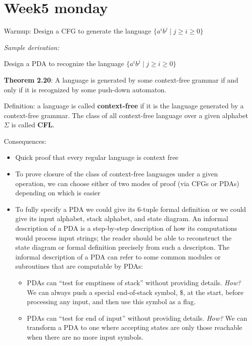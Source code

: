 \documentclass[12pt, oneside]{article}
\begin{document}
\begin{flushright}
\end{flushright} \section*{Week5 monday}


Warmup:   Design a CFG to generate the  language $\{a^i b^j \mid j \geq i  \geq 0\}$
  
\vfill
{\it Sample derivation:} 

\vspace{100pt}



Design a PDA to recognize the  language $\{a^i b^j \mid j \geq i  \geq 0\}$
  
\vspace{100pt}


\vfill
\newpage

{\bf Theorem  2.20}: A language is  generated by some context-free  grammar
if  and only if it is recognized by some push-down automaton.

Definition: a language is called {\bf context-free} if it is the language generated by a context-free grammar.
The class of all context-free language over a given alphabet $\Sigma$ is called {\bf CFL}.

Consequences:
\begin{itemize}
    \item Quick proof that every regular language is context free 
    \item To prove closure of the class of context-free languages under a given operation, we can choose 
    either of two modes 
    of proof (via CFGs or PDAs) depending on which is easier
    \item To fully specify a PDA we could give its $6$-tuple formal definition or we could give its input 
alphabet, stack alphabet, and state diagram.
An informal description of a PDA is a step-by-step description of how its computations 
would process input strings; the reader should be able to reconstruct the state diagram or formal 
definition precisely from such a descripton. The informal description of a PDA can refer to some 
common modules or subroutines that are computable by PDAs:
\begin{itemize}
  \item PDAs can ``test for emptiness of stack'' without providing details. 
  {\it How?} We can always push a special end-of-stack symbol, $\$$, at the start, before processing
  any input, and then use this symbol as a flag.
  \item PDAs can ``test for end of input'' without providing details.
  {\it How?} We can transform a PDA to one where accepting states are only those reachable 
  when there are no more input symbols.
\end{itemize}

\end{itemize}
\end{document}
